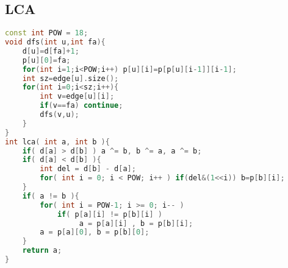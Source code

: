 ﻿\subsection{LCA}
	\begin{lstlisting}[language=C++]
const int POW = 18;  
void dfs(int u,int fa){  
    d[u]=d[fa]+1;  
    p[u][0]=fa;  
    for(int i=1;i<POW;i++) p[u][i]=p[p[u][i-1]][i-1];  
    int sz=edge[u].size();  
    for(int i=0;i<sz;i++){  
        int v=edge[u][i];  
        if(v==fa) continue;  
        dfs(v,u);  
    }  
}  
int lca( int a, int b ){  
    if( d[a] > d[b] ) a ^= b, b ^= a, a ^= b;  
    if( d[a] < d[b] ){  
        int del = d[b] - d[a];  
        for( int i = 0; i < POW; i++ ) if(del&(1<<i)) b=p[b][i];  
    }  
    if( a != b ){  
        for( int i = POW-1; i >= 0; i-- )   
            if( p[a][i] != p[b][i] )   
                 a = p[a][i] , b = p[b][i];  
        a = p[a][0], b = p[b][0];  
    }  
    return a;  
}  	
	\end{lstlisting}